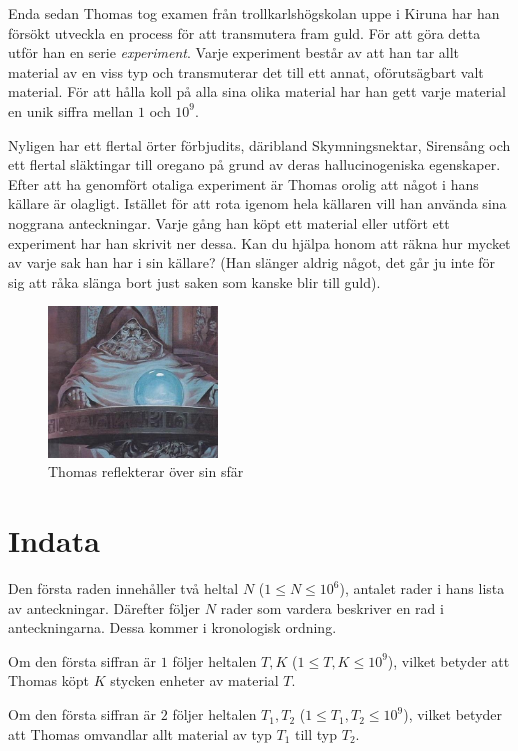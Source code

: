 Enda sedan Thomas tog examen från trollkarlshögskolan uppe i Kiruna har han försökt utveckla en process för att transmutera fram guld. För att göra detta utför
han en serie \textit{experiment}. Varje experiment består av att han tar allt material av en viss typ och transmuterar det till ett annat, oförutsägbart valt
material. För att hålla koll på alla sina olika material har han gett varje material en unik siffra mellan $1$ och $10^9$. 

Nyligen har ett flertal örter förbjudits, däribland Skymningsnektar, Sirensång och ett flertal släktingar till oregano på grund av deras
hallucinogeniska egenskaper. Efter att ha genomfört otaliga experiment är Thomas orolig att något i hans källare är olagligt. Istället för att rota
igenom hela källaren vill han använda sina noggrana anteckningar. Varje gång han köpt ett material eller utfört ett experiment har han skrivit ner dessa.
Kan du hjälpa honom att räkna hur mycket av varje sak han har i sin källare? (Han slänger aldrig något, det går ju inte för sig att råka slänga bort
just saken som kanske blir till guld).

\begin{figure}
    \centering
        \includegraphics[width=0.4\textwidth]{thomas.jpg}
    \caption{Thomas reflekterar över sin sfär}
\end{figure}

\section*{Indata}
Den första raden innehåller två heltal $N$ ($1 \leq N \leq 10^6$), antalet rader i hans lista av anteckningar.
Därefter följer $N$ rader som vardera beskriver en rad i anteckningarna. Dessa kommer i kronologisk ordning.

Om den första siffran är $1$ följer heltalen $T,K$ ($1 \leq T, K \leq 10^9$), vilket betyder att Thomas köpt $K$ stycken enheter av material $T$.

Om den första siffran är $2$ följer heltalen $T_1, T_2$ ($1 \leq T_1, T_2 \leq 10^9$), vilket betyder att Thomas omvandlar allt material av typ $T_1$ till typ $T_2$.


